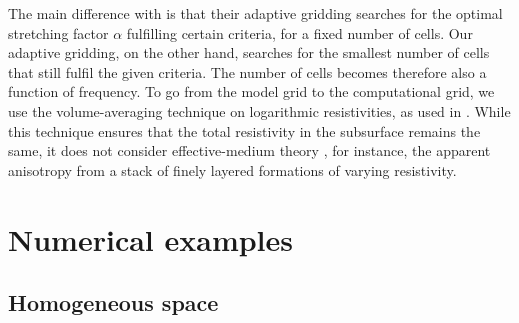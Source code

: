 \documentclass[extra, camera,%
    final,       %
]{gji}
\begin{document}
The main difference with \cite{GEO.08.Mulder} is that their adaptive gridding
searches for the optimal stretching factor $\alpha$ fulfilling certain
criteria, for a fixed number of cells. Our adaptive gridding, on the other
hand, searches for the smallest number of cells that still fulfil the
given criteria. The number of cells becomes therefore also a function of
frequency.  To go from the model grid to
the computational grid, we use the volume-averaging technique on logarithmic
resistivities, as used in \cite{GEO.07.Plessix}. While this technique ensures
that the total resistivity in the subsurface remains the same, it does not
consider effective-medium theory \citep{GEO.03.Davydycheva}, for instance, the
apparent anisotropy from a stack of finely layered formations of varying
resistivity.


\section{Numerical examples}  %


\subsection{Homogeneous space}  %
\end{document}
